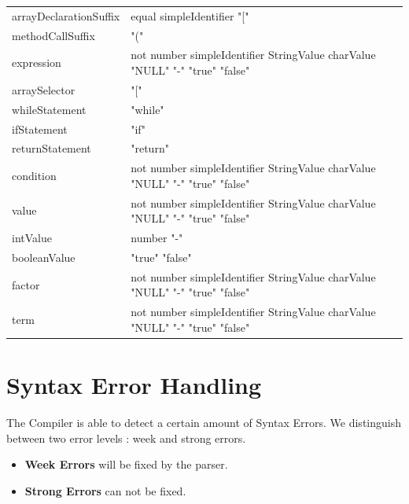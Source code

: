 \begin{tabularx}{\linewidth}{YY}
arrayDeclarationSuffix & equal simpleIdentifier "[" \\
methodCallSuffix & "(" \\
expression & not number simpleIdentifier StringValue charValue "NULL" "-" "true" "false" \\
arraySelector & "[" \\
whileStatement & "while" \\
ifStatement & "if" \\
returnStatement & "return" \\
condition & not number simpleIdentifier StringValue charValue "NULL" "-" "true" "false" \\
value & not number simpleIdentifier StringValue charValue "NULL" "-" "true" "false" \\
intValue & number "-" \\
booleanValue & "true" "false" \\
factor & not number simpleIdentifier StringValue charValue "NULL" "-" "true" "false" \\
term & not number simpleIdentifier StringValue charValue "NULL" "-" "true" "false" \\
\end{tabularx}
%

\newpage
\section{Syntax Error Handling}
The Compiler is able to detect a certain amount of Syntax Errors. We distinguish between two error levels : week and strong errors.
\begin{itemize}
  \item \textbf{Week Errors} will be fixed by the parser. 
  \item \textbf{Strong Errors} can not be fixed. 
\end{itemize}


